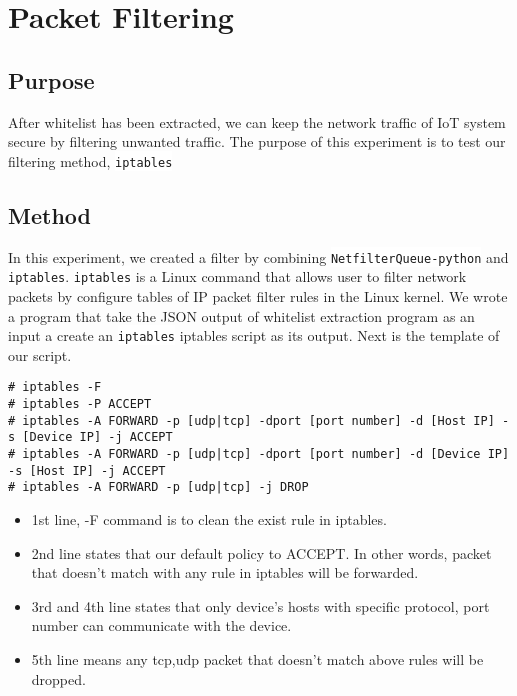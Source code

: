 
\section{Packet Filtering}
\subsection{Purpose}
After whitelist has been extracted, we can keep the network traffic of IoT system secure by filtering unwanted traffic.  
The purpose of this experiment is to test our filtering method, 
\colorbox{white}{\lstinline[basicstyle=\ttfamily\color{black}]|iptables|}
 
\subsection{Method} 
 
In this experiment, we created a filter by combining 
\colorbox{white}{\lstinline[basicstyle=\ttfamily\color{black}]|NetfilterQueue-python|}
and \newline
\colorbox{white}{\lstinline[basicstyle=\ttfamily\color{black}]|iptables|}.
\colorbox{white}{\lstinline[basicstyle=\ttfamily\color{black}]|iptables|} is a Linux command that allows user to filter network packets by configure tables of IP packet filter rules in the Linux kernel. We wrote a program that take the JSON output of whitelist extraction program as an input a create an 
\colorbox{white}{\lstinline[basicstyle=\ttfamily\color{black}]|iptables|}
iptables script as its output. Next is the template of our script.
\\

\begin{lstlisting}[label=sh]
# iptables -F  
# iptables -P ACCEPT
# iptables -A FORWARD -p [udp|tcp] -dport [port number] -d [Host IP] -s [Device IP] -j ACCEPT 
# iptables -A FORWARD -p [udp|tcp] -dport [port number] -d [Device IP] -s [Host IP] -j ACCEPT
# iptables -A FORWARD -p [udp|tcp] -j DROP 
\end{lstlisting}

\begin{itemize}
    \item 1st line, -F command is to clean the exist rule in iptables. 
    \item 2nd line states that our default policy to ACCEPT. In other words, packet that doesn't match with any rule in iptables will be forwarded.
    \item 3rd and 4th line states that only device’s hosts with specific protocol, port number can communicate with the device.
    \item 5th line means any tcp,udp packet that doesn't match above rules will be dropped.
\end{itemize}

